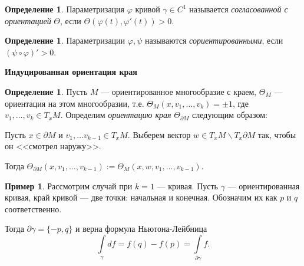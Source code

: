 \documentclass[a5paper]{article}
\newcounter{through}
\theoremstyle{plain}
\theoremstyle{definition}
\newtheorem{definition}[through]{Определение}
\newtheorem{example}[through]{Пример}
\numberwithin{through}{section}
\numberwithin{equation}{section}
\begin{document}
\begin{definition}
	Параметризация $\varphi$ кривой $\gamma \in C^1$ называется \textit{согласованной с ориентацией} $\Theta$, если $\Theta (\varphi(t), \varphi'(t)) > 0$.
\end{definition}

\begin{definition}
	Параметризации $\varphi, \psi$ называются \textit{сориентированными}, если $(\psi \circ \varphi)' > 0$.
\end{definition}

\medskip

\textbf{Индуцированная ориентация края}

\begin{definition}\label{OrientationManifoldInd}
	Пусть $M$ --- ориентированное многообразие с краем, $\Theta_M$ --- ориентация на этом многообразии, т.е. 
	$ \Theta_M(x, v_1,\ldots, v_k) = \pm 1$, где $v_1,\ldots, v_k \in T_x M$.
	Определим \textit{ориентацию края} $\Theta_{\partial M}$ следующим образом:
	
	Пусть $x \in \partial M$ и $v_1,\ldots v_{k-1} \in T_xM$. Выберем вектор $w \in T_x M \backslash T_x \partial M$ так, чтобы он
	<<смотрел наружу>>. 
	
	Тогда $\Theta_{\partial M}(x, v_1,\ldots, v_{k-1}) := \Theta_M(x, w, v_1,\ldots, v_{k-1})$.
\end{definition}

\begin{example}
	Рассмотрим случай при $k = 1$ --- кривая. Пусть $\gamma$ --- ориентированная кривая, край кривой --- две точки: начальная и конечная.
	Обозначим их как $p$ и $q$ соответственно.
	
	\begin{center}
	\end{center}  
	
	Тогда $\partial \gamma = \{ -p, q \}$ и верна формула Ньютона-Лейбница
	\[ \int\limits_{\gamma} df = f(q) - f(p) = \int\limits_{\partial \gamma} f. \]
\end{example}
\end{document}
